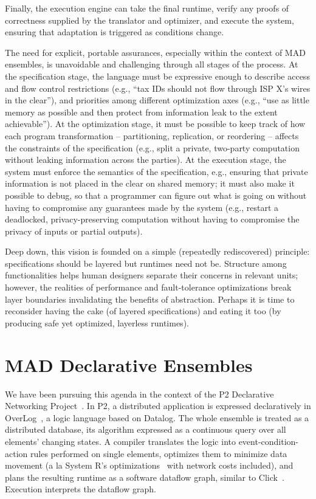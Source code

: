 \documentclass[faircopy]{sig-alternate}
\begin{document}
Finally, the execution engine can take the final runtime, verify any
proofs of correctness supplied by the translator and optimizer, and
execute the system, ensuring that adaptation is triggered as conditions
change.

The need for explicit, portable assurances, especially within the
context of MAD ensembles, is unavoidable and challenging through
all stages of the process.  At the specification stage, the language
must be expressive enough to describe access and flow control
restrictions (e.g., ``tax IDs should not flow through ISP X's wires in
the clear''), and priorities among different optimization axes (e.g., ``use as
little memory as possible and then protect from information leak to the
extent achievable'').  At the optimization stage, it must be possible to
keep track of how each program transformation -- partitioning, replication, or
reordering -- affects the constraints of the specification (e.g., split a
private, two-party computation without leaking information across the
parties).  At the execution stage, the system must enforce the semantics
of the specification, e.g., ensuring that private information is not
placed in the clear on shared memory; it must also make it possible to
debug, so that a
programmer can figure out what is going on without having to
compromise any guarantees made by the system (e.g., restart a
deadlocked, privacy-preserving computation without having to compromise
the privacy of inputs or partial outputs).

Deep down, this vision is founded on a simple (repeatedly rediscovered)
principle: specifications should be layered but runtimes need not be.
Structure among functionalities helps human designers separate their
concerns in relevant units; however, the realities of performance
and fault-tolerance optimizations break layer boundaries
invalidating the benefits of abstraction. Perhaps it is time to
reconsider having the cake (of layered specifications) and eating it too
(by producing safe yet optimized, layerless runtimes).


\section{MAD Declarative Ensembles}

We have  been pursuing this agenda in the context of
the P2 Declarative Networking Project~\cite{p2site}.  In P2, a
distributed application is expressed declaratively in OverLog~\cite{declareOverlays}, a logic language
based on Datalog. The whole
ensemble is treated as a distributed database, its algorithm expressed
as a continuous query over all elements' changing states.  A compiler
translates the logic into event-condition-action rules performed on
single elements, optimizes them to minimize data movement (a la System
R's optimizations~\cite{Selinger1979} with network costs included), and plans the resulting
runtime as a software dataflow graph, similar to
Click~\cite{Kohler2000}.  Execution interprets the dataflow graph.
\end{document}
